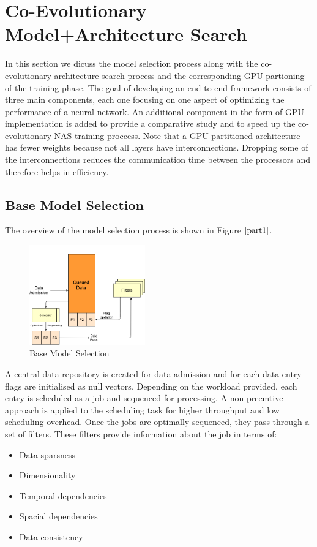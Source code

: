 \documentclass[conference]{IEEEtran}
\begin{document}
\section{Co-Evolutionary Model+Architecture Search}

In this section we dicuss the model selection process along with the co-evolutionary architecture search process and the corresponding GPU partioning of the training phase. The goal of developing an end-to-end framework consists of three main components, each one focusing on one aspect of optimizing the performance of a neural network. An additional component in the form of GPU implementation is added to provide a comparative study and to speed up the co-evolutionary NAS training proccess. Note that a GPU-partitioned architecture has fewer weights because not all layers have interconnections. Dropping some of the interconnections reduces the communication time between the processors and therefore helps in efficiency.

\subsection{Base Model Selection}
The overview of the model selection process is shown in Figure $\ref{part1}$.
\begin{figure}[!b]
\centerline{\includegraphics[width=50mm]{part1.png}}
\caption{Base Model Selection}
\label{part1}
\end{figure}

A central data repository is created for data admission and for each data entry flags are initialised as null vectors. Depending on the workload provided, each entry is scheduled as a job and sequenced for processing. A non-preemtive approach is applied to the scheduling task for higher throughput and low scheduling overhead. Once the jobs are optimally sequenced, they pass through a set of filters. These filters provide information about the job in terms of:

\begin{itemize}
\item Data sparsness
\item Dimensionality
\item Temporal dependencies
\item Spacial dependencies
\item Data consistency
\end{itemize}
\end{document}
